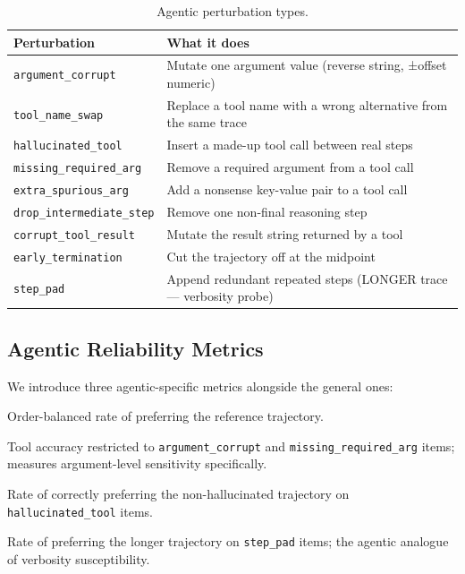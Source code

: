 \documentclass[11pt]{article}
\begin{document}
\begin{table}[h]
\centering
\small
\caption{Agentic perturbation types.}
\label{tab:agent_perturbations}
\begin{tabular}{lp{7cm}}
\toprule
\textbf{Perturbation} & \textbf{What it does} \\
\midrule
\texttt{argument\_corrupt}       & Mutate one argument value (reverse string, ±offset numeric) \\
\texttt{tool\_name\_swap}        & Replace a tool name with a wrong alternative from the same trace \\
\texttt{hallucinated\_tool}      & Insert a made-up tool call between real steps \\
\texttt{missing\_required\_arg}  & Remove a required argument from a tool call \\
\texttt{extra\_spurious\_arg}    & Add a nonsense key-value pair to a tool call \\
\texttt{drop\_intermediate\_step} & Remove one non-final reasoning step \\
\texttt{corrupt\_tool\_result}   & Mutate the result string returned by a tool \\
\texttt{early\_termination}      & Cut the trajectory off at the midpoint \\
\texttt{step\_pad}               & Append redundant repeated steps (LONGER trace — verbosity probe) \\
\bottomrule
\end{tabular}
\end{table}

\subsection{Agentic Reliability Metrics}

We introduce three agentic-specific metrics alongside the general ones:

\begin{description}[leftmargin=*]
    \item[Tool accuracy] Order-balanced rate of preferring the reference trajectory.
    \item[Argument accuracy] Tool accuracy restricted to \texttt{argument\_corrupt} and \texttt{missing\_required\_arg} items; measures argument-level sensitivity specifically.
    \item[Hallucination detection] Rate of correctly preferring the non-hallucinated trajectory on \texttt{hallucinated\_tool} items.
    \item[Trajectory-length bias] Rate of preferring the longer trajectory on \texttt{step\_pad} items; the agentic analogue of verbosity susceptibility.
\end{description}
\end{document}
